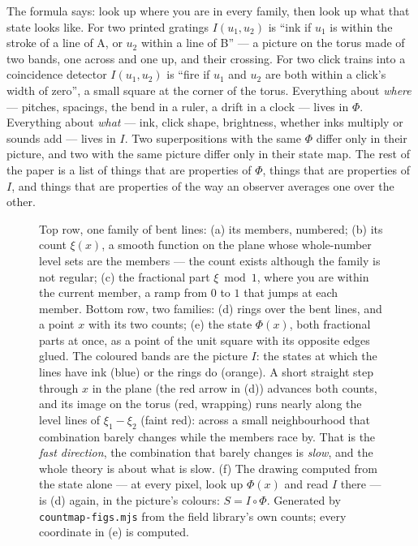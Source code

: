The formula says: look up where you are in every family, then look up what
that state looks like. For two printed gratings $I(u_1,u_2)$ is ``ink if
$u_1$ is within the stroke of a line of A, or $u_2$ within a line of B'' ---
a picture on the torus made of two bands, one across and one up, and their
crossing. For two click trains into a coincidence detector $I(u_1,u_2)$ is
``fire if $u_1$ and $u_2$ are both within a click's width of zero'', a small
square at the corner of the torus. Everything about \emph{where} ---
pitches, spacings, the bend in a ruler, a drift in a clock --- lives in
$\Phi$. Everything about \emph{what} --- ink, click shape, brightness,
whether inks multiply or sounds add --- lives in $I$. Two superpositions
with the same $\Phi$ differ only in their picture, and two with the same
picture differ only in their state map. The rest of the paper is a list of
things that are properties of $\Phi$, things that are properties of $I$, and
things that are properties of the way an observer averages one over the
other.

\begin{figure}[tp]
  \centering
  
  \caption{ Top row, one family of bent lines:
  (a) its members, numbered; (b) its count $\xi(x)$, a smooth function on
  the plane whose whole-number level sets are the members --- the count
  exists although the family is not regular; (c) the fractional part
  $\xi\bmod1$, where you are within the current member, a ramp from $0$ to
  $1$ that jumps at each member. Bottom row, two families: (d) rings over
  the bent lines, and a point $x$ with its two counts; (e) the state
  $\Phi(x)$, both fractional parts at once, as a point of the unit square
  with its opposite edges glued. The coloured bands are the picture $I$:
  the states at which the lines have ink (blue) or the rings do (orange).
  A short straight step through $x$ in the plane (the red arrow in (d))
  advances both counts, and its image on the torus (red, wrapping) runs
  nearly along the level lines of $\xi_1-\xi_2$ (faint red): across a small
  neighbourhood that combination barely changes while the members race by.
  That is the \emph{fast direction}, the combination that barely changes is
  \emph{slow}, and the whole theory is about what is slow. (f) The drawing
  computed from the state alone --- at every pixel, look up $\Phi(x)$ and
  read $I$ there --- is (d) again, in the picture's colours: $S=I\circ\Phi$.
  Generated by \texttt{countmap-figs.mjs} from the field library's own
  counts; every coordinate in (e) is computed.}
  \label{fig:torus}
\end{figure}

